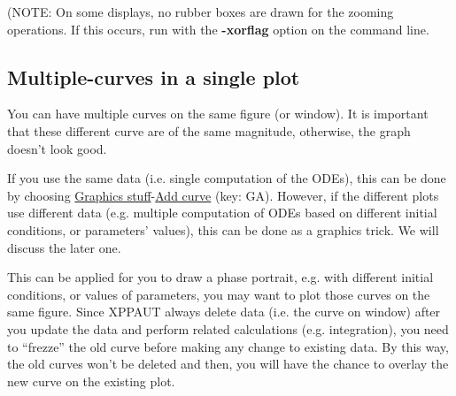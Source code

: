 (NOTE: On some displays, no rubber boxes are drawn for the zooming
operations. If this occurs, run with the {\bf -xorflag} option on the
command line.

\subsection{Multiple-curves in a single plot}
\label{sec:multiple-plot}


You can have multiple curves on the same figure (or window). It is
important that these different curve are of the same magnitude,
otherwise, the graph doesn't look good.

If you use the same data (i.e. single computation of the ODEs), this
can be done by choosing \underline{Graphics
  stuff}-\underline{Add
  curve}
(key: GA). However, if the different plots use different data
(e.g. multiple computation of ODEs based on different initial
conditions, or parameters' values), this can be done as a graphics
trick. We will discuss the later one.

This can be applied for you to draw a phase portrait, e.g. with
different initial conditions, or values of parameters, you may want to
plot those curves on the same figure.  Since XPPAUT always delete
data (i.e. the curve on window) after you update the data and perform
related calculations (e.g.  integration), you need to ``frezze'' the
old curve before making any change to existing data. By this way, the
old curves won't be deleted and then, you will have the chance to
overlay the new curve on the existing plot.

